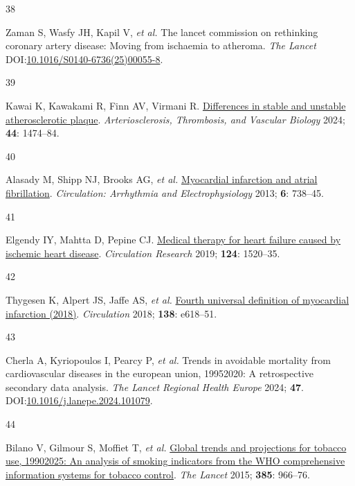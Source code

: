\documentclass[
  a4paper,
  headsepline=true,
  open=left]{scrbook}
\newlength{\cslhangindent}
\newlength{\csllabelwidth}
\newlength{\cslentryspacingunit} %
\newenvironment{CSLReferences}[2] %
 {%
  \setlength{\parindent}{0pt}
  \ifodd #1
  \let\oldpar\par
  \def\par{\hangindent=\cslhangindent\oldpar}
  \fi
  \setlength{\parskip}{#2\cslentryspacingunit}
 }%
 {}
\newcommand{\CSLLeftMargin}[1]{\parbox[t]{\csllabelwidth}{#1}}
\newcommand{\CSLRightInline}[1]{\parbox[t]{\linewidth - \csllabelwidth}{#1}\break}
\begin{document}
\begin{CSLReferences}{0}{0}
\leavevmode{}%
\CSLLeftMargin{38 }%
\CSLRightInline{Zaman S, Wasfy JH, Kapil V, \emph{et al.} The lancet
commission on rethinking coronary artery disease: Moving from ischaemia
to atheroma. \emph{The Lancet}
DOI:\href{https://doi.org/10.1016/S0140-6736(25)00055-8}{10.1016/S0140-6736(25)00055-8}.}

\leavevmode{}%
\CSLLeftMargin{39 }%
\CSLRightInline{Kawai K, Kawakami R, Finn AV, Virmani R.
\href{https://doi.org/10.1161/ATVBAHA.124.319396}{Differences in stable
and unstable atherosclerotic plaque}. \emph{Arteriosclerosis,
Thrombosis, and Vascular Biology} 2024; \textbf{44}: 1474--84.}

\leavevmode{}%
\CSLLeftMargin{40 }%
\CSLRightInline{Alasady M, Shipp NJ, Brooks AG, \emph{et al.}
\href{https://doi.org/10.1161/CIRCEP.113.000163}{Myocardial infarction
and atrial fibrillation}. \emph{Circulation: Arrhythmia and
Electrophysiology} 2013; \textbf{6}: 738--45.}

\leavevmode{}%
\CSLLeftMargin{41 }%
\CSLRightInline{Elgendy IY, Mahtta D, Pepine CJ.
\href{https://doi.org/10.1161/CIRCRESAHA.118.313568}{Medical therapy for
heart failure caused by ischemic heart disease}. \emph{Circulation
Research} 2019; \textbf{124}: 1520--35.}

\leavevmode{}%
\CSLLeftMargin{42 }%
\CSLRightInline{Thygesen K, Alpert JS, Jaffe AS, \emph{et al.}
\href{https://doi.org/10.1161/CIR.0000000000000617}{Fourth universal
definition of myocardial infarction (2018)}. \emph{Circulation} 2018;
\textbf{138}: e618--51.}

\leavevmode{}%
\CSLLeftMargin{43 }%
\CSLRightInline{Cherla A, Kyriopoulos I, Pearcy P, \emph{et al.} Trends
in avoidable mortality from cardiovascular diseases in the european
union, 1995{\textendash}2020: A retrospective secondary data analysis.
\emph{The Lancet Regional Health {\textendash} Europe} 2024;
\textbf{47}.
DOI:\href{https://doi.org/10.1016/j.lanepe.2024.101079}{10.1016/j.lanepe.2024.101079}.}

\leavevmode{}%
\CSLLeftMargin{44 }%
\CSLRightInline{Bilano V, Gilmour S, Moffiet T, \emph{et al.}
\href{https://doi.org/10.1016/S0140-6736(15)60264-1}{Global trends and
projections for tobacco use, 1990{\textendash}2025: An analysis of
smoking indicators from the WHO comprehensive information systems for
tobacco control}. \emph{The Lancet} 2015; \textbf{385}: 966--76.}


\end{CSLReferences}
\end{document}
